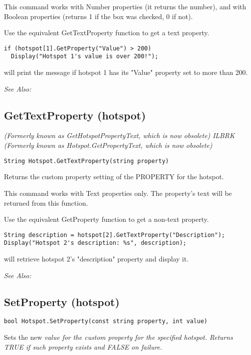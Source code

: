 This command works with Number properties (it returns the number), and with Boolean
properties (returns 1 if the box was checked, 0 if not).

Use the equivalent GetTextProperty function to get a text property.

\begin{verbatim}
if (hotspot[1].GetProperty("Value") > 200)
  Display("Hotspot 1's value is over 200!");
\end{verbatim}
will print the message if hotspot 1 has its "Value" property set to more than 200.

\it{See Also:} 


\subsection{GetTextProperty (hotspot)}\label{Hotspot.GetTextProperty}%

\it{(Formerly known as GetHotspotPropertyText, which is now obsolete)} ILBRK
\it{(Formerly known as Hotspot.GetPropertyText, which is now obsolete)}

\begin{verbatim}
String Hotspot.GetTextProperty(string property)
\end{verbatim}
Returns the custom property setting of the PROPERTY for the hotspot.

This command works with Text properties only. The property's text will be
returned from this function.

Use the equivalent GetProperty function to get a non-text property.

\begin{verbatim}
String description = hotspot[2].GetTextProperty("Description");
Display("Hotspot 2's description: %s", description);
\end{verbatim}
will retrieve hotspot 2's "description" property and display it.

\it{See Also:} 


\subsection{SetProperty (hotspot)}\label{Hotspot.SetProperty}%

\begin{verbatim}
bool Hotspot.SetProperty(const string property, int value)
\end{verbatim}
Sets the new \it{value} for the custom \it{property} for the specified hotspot. Returns
TRUE if such property exists and FALSE on failure.

